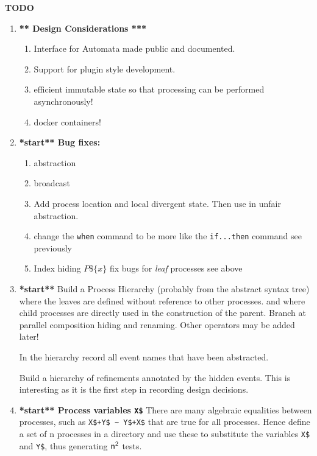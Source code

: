 \documentclass[]{article}
\begin{document}
\begin{center}{\bf \Huge  TODO }\end{center}
\begin{enumerate}
\item {\bf *** Design Considerations ***}  

\begin{enumerate}
\item Interface for Automata  made public and documented. 
\item Support for plugin style development.
\item efficient immutable state so that processing can be performed asynchronously!
\item docker containers!
\end{enumerate} 

\item {\bf **start** Bug fixes:}
\begin{enumerate}
\item abstraction
\item broadcast
\item Add process location and local divergent state.  Then  use in unfair abstraction.
\item change  the \verb|when| command to be more like the \verb|if...then| command see previously 
\item Index hiding   $P\$\{x\}$ fix bugs for \emph{leaf} processes see above 


\end{enumerate}



\item {\bf **start**}  Build a  {\sf Process Hierarchy} (probably from the abstract syntax tree) where the leaves are defined without reference to other processes. and where child processes are directly used in the construction of the parent. Branch at parallel composition hiding and renaming. Other operators may be added later!

In the hierarchy record all event names that have been abstracted.

Build a hierarchy of refinements annotated by the hidden events. This is interesting as it is the first step in recording  design decisions.

\item {\bf  **start** Process variables \verb|X$|} There are many algebraic equalities between processes, such as  \verb|X$+Y$ ~ Y$+X$| that are true for all processes. Hence define a set of {\sf n} processes in a directory and use these to substitute the variables \verb|X$| and \verb|Y$|, thus generating   ${\sf n^2}$ tests.


\end{enumerate}
\end{document}
